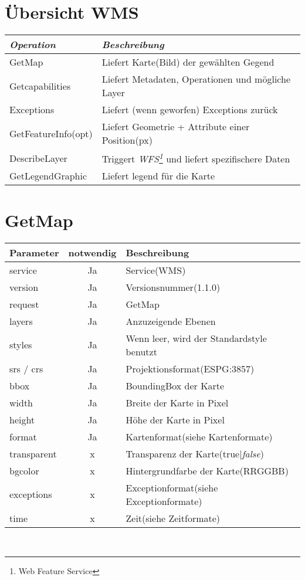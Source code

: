 \section{\"Ubersicht WMS}
\begin{tabular}{ll}
\emph{Operation} & \emph{Beschreibung} \\
\hline 
GetMap & Liefert Karte(Bild) der gew\"ahlten Gegend \\ 
\hline 
Getcapabilities & Liefert Metadaten, Operationen und m\"ogliche Layer \\ 
\hline 
Exceptions & Liefert (wenn geworfen) Exceptions zur\"uck \\ 
\hline 
GetFeatureInfo(opt) & Liefert Geometrie + Attribute einer Position(px) \\ 
\hline 
DescribeLayer & Triggert \emph{WFS\footnote{Web Feature Service}} und liefert spezifischere Daten \\ 
\hline 
GetLegendGraphic & Liefert legend f\"ur die Karte \\ 
\hline 
\end{tabular} 
\section{GetMap}\begin{tabular}{lcl}
\textbf{Parameter} & \textbf{notwendig} & \textbf{Beschreibung}\\
\hline 
service & Ja & Service(WMS) \\ 
\hline 
version & Ja & Versionsnummer(1.1.0) \\ 
\hline 
request & Ja & GetMap \\ 
\hline 
layers & Ja & Anzuzeigende Ebenen \\ 
\hline 
styles & Ja & Wenn leer, wird der Standardstyle benutzt \\ 
\hline 
srs / crs & Ja & Projektionsformat(ESPG:3857) \\ 
\hline 
bbox & Ja & BoundingBox der Karte \\ 
\hline 
width & Ja & Breite der Karte in Pixel \\ 
\hline 
height & Ja & H\"ohe der Karte in Pixel \\ 
\hline 
format & Ja & Kartenformat(siehe Kartenformate)\\
\hline 
transparent & x & Transparenz der Karte(true|\emph{false}) \\ 
\hline 
bgcolor & x & Hintergrundfarbe der Karte(RRGGBB) \\ 
\hline 
exceptions & x & Exceptionformat(siehe Exceptionformate) \\ 
\hline 
time & x & Zeit(siehe Zeitformate) \\ 
\hline 
\end{tabular} \\


